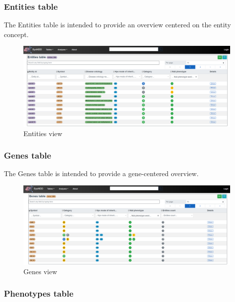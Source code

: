 \documentclass[
]{article}
\begin{document}
\hypertarget{entities-table}{%
\subsubsection{Entities table}\label{entities-table}}

The Entities table is intended to provide an overview centered on the entity concept.

\begin{figure}
\centering
\includegraphics{./static/img/02_07-sysndd.dbmr.unibe.ch_Entities.png}
\caption{Entities view}
\end{figure}

\hypertarget{genes-table}{%
\subsubsection{Genes table}\label{genes-table}}

The Genes table is intended to provide a gene-centered overview.

\begin{figure}
\centering
\includegraphics{./static/img/02_08-sysndd.dbmr.unibe.ch_Genes.png}
\caption{Genes view}
\end{figure}

\hypertarget{phenotypes-table}{%
\subsubsection{Phenotypes table}\label{phenotypes-table}}
\end{document}

